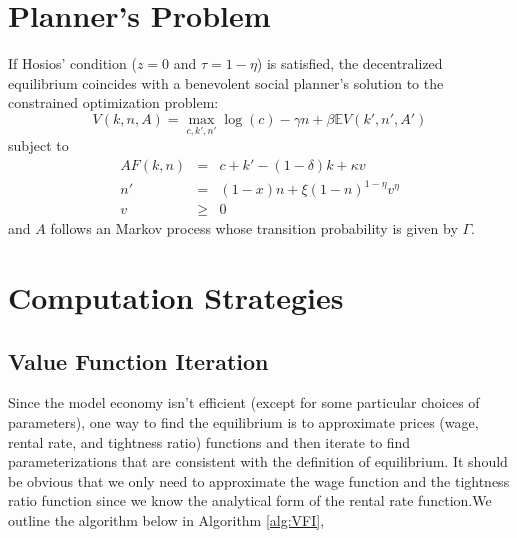 \documentclass[12pt]{article}
\begin{document}
\section{Planner's Problem}
If Hosios' condition ($z=0$ and $\tau = 1-\eta$) is satisfied, the decentralized equilibrium coincides with a benevolent social planner's solution to the constrained optimization problem:
	\begin{equation}
	V(k,n,A) = \max_{c,k',n'}  \log(c) - \gamma n+\beta \mathbb{E} V(k',n',A') 
	\end{equation}
	subject to
	\begin{eqnarray}
	A F(k,n) &=&  c + k' - (1-\delta)k + \kappa v \\ 
	n' &=& (1-x)n + \xi (1-n)^{1-\eta} v^{\eta}  \\
	v &\ge& 0
	\end{eqnarray}
	and $A$ follows an Markov process whose transition probability is given by $\Gamma$.

\section{Computation Strategies}
\subsection{Value Function Iteration}
Since the model economy isn't efficient (except for some particular choices of parameters), one way to find the equilibrium is to approximate prices (wage, rental rate, and tightness ratio) functions and then iterate to find parameterizations that are consistent with the definition of equilibrium. It should be obvious that we only need to approximate the wage function and the tightness ratio function since we know the analytical form of the rental rate function.We outline the algorithm below in Algorithm \ref{alg:VFI},
\end{document}
